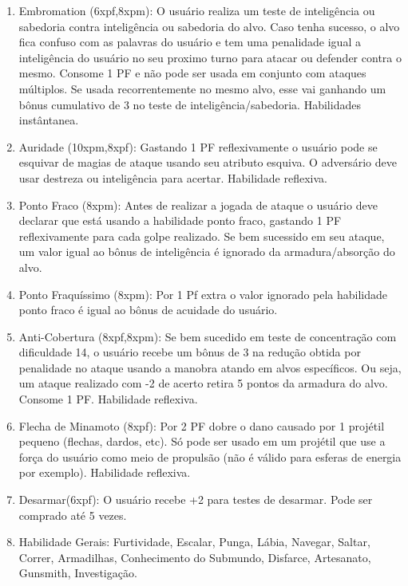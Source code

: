 \begin{enumerate}
	\item Embromation (6xpf,8xpm): O usuário realiza um teste de inteligência ou sabedoria contra inteligência ou sabedoria do alvo. Caso tenha sucesso, o alvo fica confuso com as palavras do usuário e tem uma penalidade igual a inteligência do usuário no seu proximo turno para atacar ou defender contra o mesmo. Consome 1 PF e não pode ser usada em conjunto com ataques múltiplos. Se usada recorrentemente no mesmo alvo, esse vai ganhando um bônus cumulativo de 3 no teste de inteligência/sabedoria. Habilidades instântanea.

  \item Auridade (10xpm,8xpf): Gastando 1 PF reflexivamente o usuário pode se esquivar de magias de ataque usando seu atributo esquiva. O adversário deve usar destreza ou inteligência para acertar. Habilidade reflexiva.   

  \item Ponto Fraco (8xpm): Antes de realizar a jogada de ataque o usuário deve declarar que está usando a habilidade ponto fraco, gastando 1 PF reflexivamente para cada golpe realizado. Se bem sucessido em seu ataque, um valor igual ao bônus de inteligência é ignorado da armadura/absorção do alvo.

  \item Ponto Fraquíssimo (8xpm): Por 1 Pf extra o valor ignorado pela habilidade ponto fraco é igual ao bônus de acuidade do usuário.

	\item Anti-Cobertura (8xpf,8xpm): Se bem sucedido em teste de concentração com dificuldade 14, o usuário recebe um bônus de 3 na redução obtida por penalidade no ataque usando a manobra atando em alvos específicos. Ou seja, um ataque realizado com -2 de acerto retira 5 pontos da armadura do alvo. Consome 1 PF. Habilidade reflexiva. 	

	\item Flecha de Minamoto (8xpf): Por 2 PF dobre o dano causado por 1 projétil pequeno (flechas, dardos, etc). Só pode ser usado em um projétil que use a força do usuário como meio de propulsão (não é válido para esferas de energia por exemplo). Habilidade reflexiva.

 	\item Desarmar(6xpf): O usuário recebe +2 para testes de desarmar. Pode ser comprado até 5 vezes. 	

 \item Habilidade Gerais: Furtividade, Escalar, Punga, Lábia, Navegar, Saltar, Correr, Armadilhas, Conhecimento do Submundo, Disfarce, Artesanato, Gunsmith, Investigação.
 
\end{enumerate}
 
